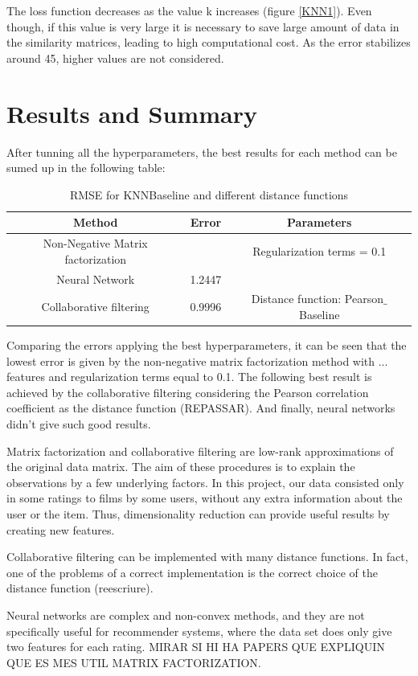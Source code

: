 \documentclass[11pt,conference]{IEEEtran}
\begin{document}
The loss function decreases as the value k increases (figure \ref{KNN1}). Even though, if this value is very large it is necessary to save large amount of data in the similarity matrices, leading to high computational cost. As the error stabilizes around 45, higher values are not considered.

\section{Results and Summary}
After tunning all the hyperparameters, the best results for each method can be sumed up in the following table:
\begin{table}[htbp]
\begin{center}
\begin{tabular}{|c|c|c|} \hline
Method & Error & Parameters\\ \hline
Non-Negative Matrix factorization &  &Regularization terms = 0.1  \\
\hline 
Neural Network & 1.2447 &  \\ \hline
Collaborative filtering & 0.9996 & Distance function: Pearson$\_$Baseline \\ \hline
\end{tabular}
\end{center}
\caption{RMSE for KNNBaseline and different distance functions}
\end{table}
Comparing the errors applying the best hyperparameters, it can be seen that the lowest error is given by the non-negative matrix factorization method with ... features and regularization terms equal to 0.1.
The following best result is achieved by the collaborative filtering considering the Pearson correlation coefficient as the distance function (REPASSAR). And finally, neural networks didn't give such good results.

Matrix factorization and collaborative filtering are low-rank approximations of the original data matrix. The aim of these procedures is to explain the observations by a few underlying factors. In this project, our data consisted only in some ratings to films by some users, without any extra information about the user or the item. Thus, dimensionality reduction can provide useful results by creating new features.

Collaborative filtering can be implemented with many distance functions. In fact, one of the problems of a correct implementation is the correct choice of the distance function (reescriure).

Neural networks are complex and non-convex methods, and they are not specifically useful for recommender systems, where the data set does only give two features for each rating. MIRAR SI HI HA PAPERS QUE EXPLIQUIN QUE ES MES UTIL MATRIX FACTORIZATION.
\end{document}
